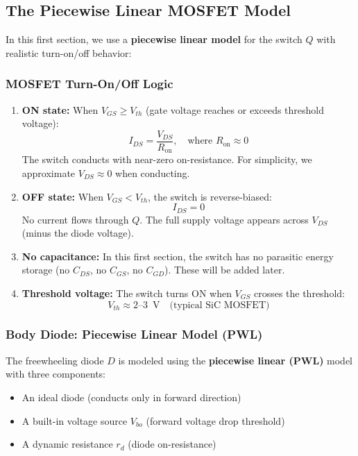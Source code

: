 \documentclass[11pt, a4paper]{article}
\newcommand{\vds}{V_{DS}}
\newcommand{\vgs}{V_{GS}}
\newcommand{\ids}{I_{DS}}
\newcommand{\vth}{V_{th}}
\newcommand{\ron}{R_{\text{on}}}
\begin{document}
\subsection{The Piecewise Linear MOSFET Model}

In this first section, we use a \textbf{piecewise linear model} for the switch $Q$ with realistic turn-on/off behavior:

\subsubsection{MOSFET Turn-On/Off Logic}

\begin{enumerate}
    \item \textbf{ON state:} When $\vgs \geq \vth$ (gate voltage reaches or exceeds threshold voltage):
    \[
        \ids = \frac{\vds}{\ron}, \quad \text{where } \ron \approx 0
    \]
    The switch conducts with near-zero on-resistance. For simplicity, we approximate $\vds \approx 0$ when conducting.

    \item \textbf{OFF state:} When $\vgs < \vth$, the switch is reverse-biased:
    \[
        \ids = 0
    \]
    No current flows through $Q$. The full supply voltage appears across $\vds$ (minus the diode voltage).

    \item \textbf{No capacitance:} In this first section, the switch has no parasitic energy storage (no $C_{DS}$, no $C_{GS}$, no $C_{GD}$). These will be added later.

    \item \textbf{Threshold voltage:} The switch turns ON when $\vgs$ crosses the threshold:
    \[
        \vth \approx 2\text{--}3\,\text{ V} \quad \text{(typical SiC MOSFET)}
    \]
\end{enumerate}

\subsubsection{Body Diode: Piecewise Linear Model (PWL)}

The freewheeling diode $D$ is modeled using the \textbf{piecewise linear (PWL)} model with three components:
\begin{itemize}
    \item An ideal diode (conducts only in forward direction)
    \item A built-in voltage source $V_{bo}$ (forward voltage drop threshold)
    \item A dynamic resistance $r_d$ (diode on-resistance)
\end{itemize}
\end{document}
